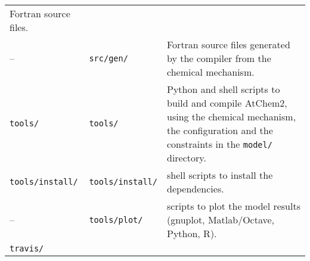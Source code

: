 \begin{longtable}[]{@{}lll@{}}
\begin{minipage}[t]{0.48\columnwidth}
Fortran source files.\strut
\end{minipage}\tabularnewline
\begin{minipage}[t]{0.20\columnwidth}\raggedright
--\strut
\end{minipage} & \begin{minipage}[t]{0.24\columnwidth}\raggedright
\texttt{src/gen/}\strut
\end{minipage} & \begin{minipage}[t]{0.48\columnwidth}\raggedright
Fortran source files generated by the compiler from the chemical
mechanism.\strut
\end{minipage}\tabularnewline
\begin{minipage}[t]{0.20\columnwidth}\raggedright
\texttt{tools/}\strut
\end{minipage} & \begin{minipage}[t]{0.24\columnwidth}\raggedright
\texttt{tools/}\strut
\end{minipage} & \begin{minipage}[t]{0.48\columnwidth}\raggedright
Python and shell scripts to build and compile AtChem2, using the
chemical mechanism, the configuration and the constraints in the
\texttt{model/} directory.\strut
\end{minipage}\tabularnewline
\begin{minipage}[t]{0.20\columnwidth}\raggedright
\texttt{tools/install/}\strut
\end{minipage} & \begin{minipage}[t]{0.24\columnwidth}\raggedright
\texttt{tools/install/}\strut
\end{minipage} & \begin{minipage}[t]{0.48\columnwidth}\raggedright
shell scripts to install the dependencies.\strut
\end{minipage}\tabularnewline
\begin{minipage}[t]{0.20\columnwidth}\raggedright
--\strut
\end{minipage} & \begin{minipage}[t]{0.24\columnwidth}\raggedright
\texttt{tools/plot/}\strut
\end{minipage} & \begin{minipage}[t]{0.48\columnwidth}\raggedright
scripts to plot the model results (gnuplot, Matlab/Octave, Python,
R).\strut
\end{minipage}\tabularnewline
\begin{minipage}[t]{0.20\columnwidth}\raggedright
\texttt{travis/}\strut
\end{minipage} & \begin{minipage}[t]{0.24\columnwidth}\raggedright

\end{minipage}
\end{longtable}
